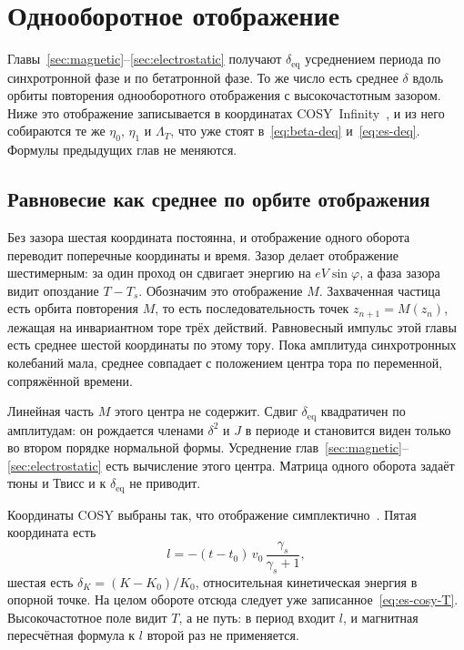 \section{Однооборотное отображение}
\label{sec:map}

Главы~\ref{sec:magnetic}--\ref{sec:electrostatic} получают $\delta_{\mathrm{eq}}$ усреднением периода по синхротронной фазе и по бетатронной фазе. То же число есть среднее $\delta$ вдоль орбиты повторения однооборотного отображения с высокочастотным зазором. Ниже это отображение записывается в координатах COSY~Infinity~\cite{Berz1990}, и из него собираются те же $\eta_0$, $\eta_1$ и $\Lambda_T$, что уже стоят в~\eqref{eq:beta-deq} и~\eqref{eq:es-deq}. Формулы предыдущих глав не меняются.

\subsection{Равновесие как среднее по орбите отображения}
\label{sec:map-orbit}

Без зазора шестая координата постоянна, и отображение одного оборота переводит поперечные координаты и время. Зазор делает отображение шестимерным: за один проход он сдвигает энергию на $eV\sin\varphi$, а фаза зазора видит опоздание $T-T_s$. Обозначим это отображение $M$. Захваченная частица есть орбита повторения $M$, то есть последовательность точек $z_{n+1}=M(z_n)$, лежащая на инвариантном торе трёх действий. Равновесный импульс этой главы есть среднее шестой координаты по этому тору. Пока амплитуда синхротронных колебаний мала, среднее совпадает с положением центра тора по переменной, сопряжённой времени.

Линейная часть $M$ этого центра не содержит. Сдвиг $\delta_{\mathrm{eq}}$ квадратичен по амплитудам: он рождается членами $\delta^2$ и $J$ в периоде и становится виден только во втором порядке нормальной формы. Усреднение глав~\ref{sec:magnetic}--\ref{sec:electrostatic} есть вычисление этого центра. Матрица одного оборота задаёт тюны и Твисс и к $\delta_{\mathrm{eq}}$ не приводит.

Координаты COSY выбраны так, что отображение симплектично~\cite{Berz1990}. Пятая координата есть
\begin{equation}
\label{eq:map-l}
l=-(t-t_0)\,v_0\,\frac{\gamma_s}{\gamma_s+1},
\end{equation}
шестая есть $\delta_K=(K-K_0)/K_0$, относительная кинетическая энергия в опорной точке. На целом обороте отсюда следует уже записанное~\eqref{eq:es-cosy-T}. Высокочастотное поле видит $T$, а не путь: в период входит $l$, и магнитная пересчётная формула к $l$ второй раз не применяется.


